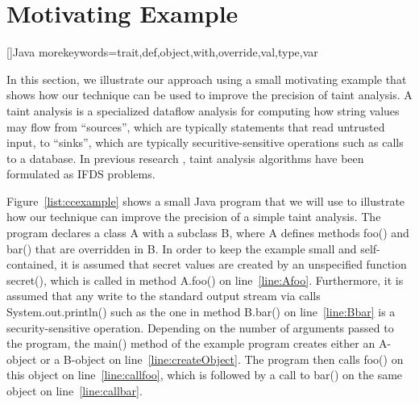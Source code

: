 \section{Motivating Example}
  \label{sec:MotivatingExample}
  
\newcommand{\code}[1]{\textsf{#1}}  
[]{Java}{
   morekeywords={trait,def,object,with,override,val,type,var} 
}

\lstdefinestyle{Eclipse}{
  xleftmargin=0pt,
  language = scala,
  basicstyle=\sffamily\small,
  stringstyle=\color{sh_string},
  keywordstyle = \color{sh_keyword}\bfseries,  %
  lineskip=-0.0em,
  commentstyle=\color{sh_comment}\itshape,  
  escapeinside={/*@}{@*/},
  numbersep=5pt,
  captionpos=b,
  xleftmargin=0.4cm, xrightmargin=0.5cm,
   morekeywords={invokestatic,invokeinterface,invokevirtual,invokespecial},
}


  
In this section, we illustrate our approach using a small motivating example that
shows how our technique can be used to improve the precision of taint analysis.
A taint analysis is a specialized dataflow analysis for computing how string values
may flow from ``sources'', which are typically statements that read untrusted input, 
to ``sinks'', which are typically securitive-sensitive operations such as calls to 
a database. In previous research , taint analysis algorithms have been 
formulated as IFDS problems.     
  

  
Figure~\ref{list:ccexample} shows a small Java program that we will use to illustrate
how our technique can improve the precision of a simple taint analysis. The program
declares a class \code{A} with a subclass \code{B},  where \code{A} defines methods 
\code{foo()} and \code{bar()} that are overridden in \code{B}.  In order to keep the 
example small and self-contained, it is assumed  that secret values are created by 
an unspecified function \code{secret()}, which is called in method \code{A.foo()} on 
line~\ref{line:Afoo}. Furthermore, it is assumed that any write to the standard output 
stream via calls \code{System.out.println()} such as the one in method \code{B.bar()} 
on line~\ref{line:Bbar} is a security-sensitive operation. Depending on the number of 
arguments passed to the program, the \code{main()} method of the example program creates 
either an \code{A}-object or a \code{B}-object on line~\ref{line:createObject}. The 
program then calls \code{foo()} on this object on line~\ref{line:callfoo}, which is 
followed by a call to \code{bar()} on the same object on line~\ref{line:callbar}.  
 
